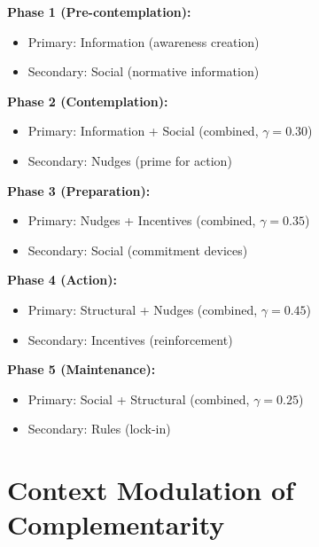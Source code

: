\begin{tcolorbox}[colback=red!5!white,colframe=red!75!black,title=\textbf{Recommended BCJ Intervention Sequence}]

\textbf{Phase 1 (Pre-contemplation):}
\begin{itemize}[noitemsep]
    \item Primary: Information (awareness creation)
    \item Secondary: Social (normative information)
\end{itemize}

\textbf{Phase 2 (Contemplation):}
\begin{itemize}[noitemsep]
    \item Primary: Information + Social (combined, $\gamma = 0.30$)
    \item Secondary: Nudges (prime for action)
\end{itemize}

\textbf{Phase 3 (Preparation):}
\begin{itemize}[noitemsep]
    \item Primary: Nudges + Incentives (combined, $\gamma = 0.35$)
    \item Secondary: Social (commitment devices)
\end{itemize}

\textbf{Phase 4 (Action):}
\begin{itemize}[noitemsep]
    \item Primary: Structural + Nudges (combined, $\gamma = 0.45$)
    \item Secondary: Incentives (reinforcement)
\end{itemize}

\textbf{Phase 5 (Maintenance):}
\begin{itemize}[noitemsep]
    \item Primary: Social + Structural (combined, $\gamma = 0.25$)
    \item Secondary: Rules (lock-in)
\end{itemize}
\end{tcolorbox}

\section{Context Modulation of Complementarity}
\label{sec:context}

